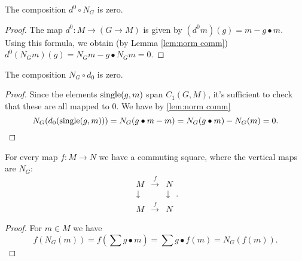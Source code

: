 \begin{lemma}	\label{lem:norm comp d}
	\leanok
	The composition $d^0 \circ N_G$ is zero.
\end{lemma}

\begin{proof}
	The map $d^0 : M \to (G \to M)$ is given by
	$(d^0 m)(g) = m - g\bullet m$.
	Using this formula, we obtain (by Lemma \ref{lem:norm comm})
	$d^0 (N_G m) (g) = N_G m - g \bullet N_G m = 0$.
\end{proof}

\begin{lemma}	\label{lem:d comp norm}
	The composition $N_G \circ d_0$ is zero.
\end{lemma}

\begin{proof}
	Since the elements $\mathrm{single}(g,m)$ span $C_1(G,M)$, it's sufficient to check
	that these are all mapped to $0$.
	We have by \ref{lem:norm comm}
	\[
		N_G(d_0 (\mathrm{single}(g,m)))
		=
		N_G( g \bullet m - m)
		=
		N_G( g \bullet m) - N_G(m)
		= 0.
	\]
\end{proof}


\begin{lemma} \label{lem:norm naturality}
	For every map $f : M \to N$ we have a commuting square, where the
	vertical maps are $N_G$:
	\[
		\begin{matrix}
			M & \stackrel{f}\to & N \\
			\downarrow && \downarrow \\
			M & \stackrel{f}\to & N
		\end{matrix} .
	\]
\end{lemma}

\begin{proof}
	For $m \in M$ we have
	\[
		f(N_G (m)) = f\left( \sum g \bullet m\right)
		=\sum g \bullet f(  m)
		=N_G(f(m)).
	\]
\end{proof}



